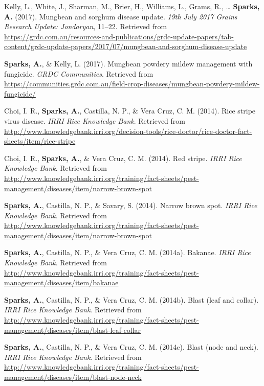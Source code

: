 \documentclass[11pt, a4paper]{awesome-cv}
\begin{document}
\leavevmode\hypertarget{ref-Kelly2017}{}%
Kelly, L., White, J., Sharman, M., Brier, H., Williams, L., Grams, R.,
\ldots{} \textbf{Sparks, A.} (2017). Mungbean and sorghum disease
update. \emph{19th July 2017 Grains Research Update: Jondaryan}, 11--22.
Retrieved from
\url{https://grdc.com.au/resources-and-publications/grdc-update-papers/tab-content/grdc-update-papers/2017/07/mungbean-and-sorghum-disease-update}

\leavevmode\hypertarget{ref-Sparks2017}{}%
\textbf{Sparks, A.}, \& Kelly, L. (2017). Mungbean powdery mildew
management with fungicide. \emph{GRDC Communities}. Retrieved from
\url{https://communities.grdc.com.au/field-crop-diseases/mungbean-powdery-mildew-fungicide/}

\leavevmode\hypertarget{ref-Choi2014b}{}%
Choi, I. R., \textbf{Sparks, A.}, Castilla, N. P., \& Vera Cruz, C. M.
(2014). Rice stripe virus disease. \emph{{IRRI} Rice Knowledge Bank}.
Retrieved from
\url{http://www.knowledgebank.irri.org/decision-tools/rice-doctor/rice-doctor-fact-sheets/item/rice-stripe}

\leavevmode\hypertarget{ref-Choi2014}{}%
Choi, I. R., \textbf{Sparks, A.}, \& Vera Cruz, C. M. (2014). Red
stripe. \emph{{IRRI} Rice Knowledge Bank}. Retrieved from
\url{http://www.knowledgebank.irri.org/training/fact-sheets/pest-management/diseases/item/narrow-brown-spot}

\leavevmode\hypertarget{ref-Sparks2014f}{}%
\textbf{Sparks, A.}, Castilla, N. P., \& Savary, S. (2014). Narrow brown
spot. \emph{{IRRI} Rice Knowledge Bank}. Retrieved from
\url{http://www.knowledgebank.irri.org/training/fact-sheets/pest-management/diseases/item/narrow-brown-spot}

\leavevmode\hypertarget{ref-Sparks2014}{}%
\textbf{Sparks, A.}, Castilla, N. P., \& Vera Cruz, C. M. (2014a).
Bakanae. \emph{{IRRI} Rice Knowledge Bank}. Retrieved from
\url{http://www.knowledgebank.irri.org/training/fact-sheets/pest-management/diseases/item/bakanae}

\leavevmode\hypertarget{ref-Sparks2014b}{}%
\textbf{Sparks, A.}, Castilla, N. P., \& Vera Cruz, C. M. (2014b). Blast
(leaf and collar). \emph{{IRRI} Rice Knowledge Bank}. Retrieved from
\url{http://www.knowledgebank.irri.org/training/fact-sheets/pest-management/diseases/item/blast-leaf-collar}

\leavevmode\hypertarget{ref-Sparks2014c}{}%
\textbf{Sparks, A.}, Castilla, N. P., \& Vera Cruz, C. M. (2014c). Blast
(node and neck). \emph{{IRRI} Rice Knowledge Bank}. Retrieved from
\url{http://www.knowledgebank.irri.org/training/fact-sheets/pest-management/diseases/item/blast-node-neck}
\end{document}
